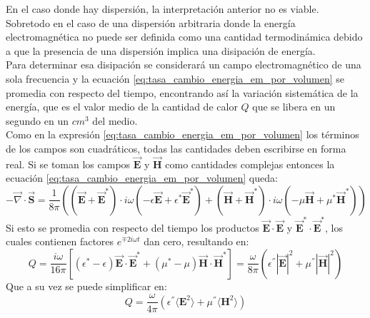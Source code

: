 \documentclass[../tesis_main_file.tex]{subfiles}
\begin{document}
En el caso donde hay dispersión, la interpretación anterior no es viable. Sobretodo en el caso de una dispersión arbitraria donde la energía electromagnética no puede ser definida como una cantidad termodinámica debido a que la presencia de una dispersión implica una disipación de energía.\\
Para determinar esa disipación se considerará un campo electromagnético de una sola frecuencia y la ecuación \ref{eq:tasa_cambio_energia_em_por_volumen} se promedia con respecto del tiempo, encontrando así la variación sistemática de la energía, que es el valor medio de la cantidad de calor $Q$ que se libera en un segundo en un $cm^3$ del medio.\\
Como en la expresión \ref{eq:tasa_cambio_energia_em_por_volumen} los términos de los campos son cuadráticos, todas las cantidades deben escribirse en forma real. Si se toman los campos $\overrightarrow{\textbf{E}}$ y $\overrightarrow{\textbf{H}}$ como cantidades complejas entonces la ecuación \ref{eq:tasa_cambio_energia_em_por_volumen} queda:
\begin{equation}
\label{eq:tasa_energia_em_compleja}
- \overrightarrow{\nabla} \cdot \overrightarrow{\textbf{S}} = \frac{1}{8\pi}\left((\overrightarrow{\textbf{E}} + \overrightarrow{\textbf{E}}^*)\cdot i\omega(-\epsilon \overrightarrow{\textbf{E}}+\epsilon ^* \overrightarrow{\textbf{E}}^*)+ (\overrightarrow{\textbf{H}} + \overrightarrow{\textbf{H}}^*)\cdot i\omega(-\mu \overrightarrow{\textbf{H}}+\mu ^* \overrightarrow{\textbf{H}}^*)\right)
\end{equation}
Si esto se promedia con respecto del tiempo los productos $\overrightarrow{\textbf{E}} \cdot \overrightarrow{\textbf{E}}$ y $\overrightarrow{\textbf{E}}^* \cdot \overrightarrow{\textbf{E}}^*$, los cuales contienen factores $e^{\mp2i\omega t}$ dan cero, resultando en:
\begin{equation}
Q =\frac{i\omega}{16\pi}\left[(\epsilon ^* -\epsilon)\overrightarrow{\textbf{E}} \cdot \overrightarrow{\textbf{E}}^* + (\mu ^* - \mu)\overrightarrow{\textbf{H}} \cdot \overrightarrow{\textbf{H}}^*\right]= \frac{\omega}{8\pi}\left(\epsilon ^{''}|\overrightarrow{\textbf{E}}|^2 + \mu ^{''}|\overrightarrow{\textbf{H}}|^2\right)
\end{equation}
Que a su vez se puede simplificar en:
\begin{equation}
\label{eq:Q_promedio_temp_dispersion}
Q =\frac{\omega}{4\pi}\left(\epsilon ^{''}\langle\textbf{E}^2\rangle + \mu ^{''} \langle\textbf{H}^2\rangle\right)
\end{equation}
\end{document}

